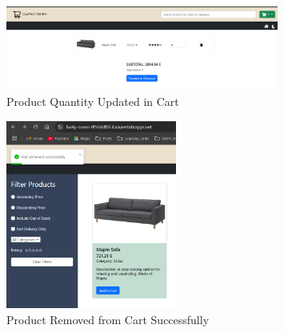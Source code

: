 \documentclass{llncs}
\begin{document}
\vspace{10mm}  %

\begin{figure}[H]
    \centering
    \includegraphics[width=0.8\textwidth]{../images/Cart_Item_Increase.png}  %
    \vspace{3mm}  %
    \caption{Product Quantity Updated in Cart}
    \label{fig:Webshop_4}
\end{figure}

\begin{figure}[H]
    \centering
    \includegraphics[width=0.5\textwidth]{../images/Item_remove_from_cart.png}  %
    \vspace{3mm}  %
    \caption{Product Removed from Cart Successfully}
    \label{fig:Webshop_5}
\end{figure}
\vspace{10mm}  %
\end{document}
